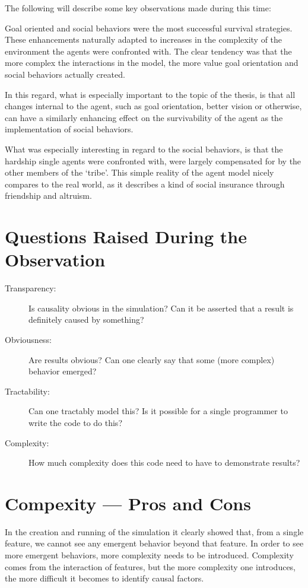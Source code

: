\noindent
The following will describe some key observations made during this time:

Goal oriented and social behaviors were the most successful survival strategies. These enhancements naturally adapted to increases in the complexity of the environment the agents were confronted with. The clear tendency was that the more complex the interactions in the model, the more value goal orientation and social behaviors actually created.

In this regard, what is especially important to the topic of the thesis, is that all changes internal to the agent, such as goal orientation, better vision or otherwise, can have a similarly enhancing effect on the survivability of the agent as the implementation of social behaviors.

What was especially interesting in regard to the social behaviors, is that the hardship single agents were confronted with, were largely compensated for by the other members of the `tribe'. This simple reality of the agent model nicely compares to the real world, as it describes a kind of social insurance through friendship and altruism.

\section{Questions Raised During the Observation}
\begin{description}
  \item[Transparency:] Is causality obvious in the simulation? Can it be asserted that a result is definitely caused by something?
  \item[Obviousness:] Are results obvious? Can one clearly say that some (more complex) behavior emerged?
  \item[Tractability:] Can one tractably model this? Is it possible for a single programmer to write the code to do this?
  \item[Complexity:] How much complexity does this code need to have to demonstrate results?
\end{description}

\section{Compexity --- Pros and Cons}
In the creation and running of the simulation it clearly showed that, from a single feature, we cannot see any emergent behavior beyond that feature. In order to see more emergent behaviors, more complexity needs to be introduced. Complexity comes from the interaction of features, but the more complexity one introduces, the more difficult it becomes to identify causal factors.

